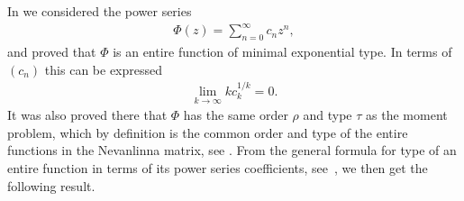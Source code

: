 In \cite[Section 3]{B:S2} we considered the power series
\begin{gather*}
\Phi(z)=\sum_{n=0}^\infty c_nz^n,
\end{gather*}
and proved that $\Phi$ is an entire function of minimal exponential type. In terms of $(c_n)$ this
can be expressed
\begin{gather}\label{eq:minexpt}
\lim_{k\to\infty} k c_k^{1/k} =0.
\end{gather}
It was also proved there that $\Phi$ has the same order $\rho$ and type $\tau$ as the moment problem, which by definition is the common order and type of the entire functions in the Nevanlinna matrix, see \cite{B:P,B:P:H}. From the general formula for type of an entire function in terms of its power series coefficients, see~\cite{Le}, we then get the following result.
